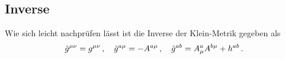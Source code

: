 \subsection{Inverse}
Wie sich leicht nachprüfen lässt ist die Inverse der Klein-Metrik gegeben als
\begin{equation}
\tensor{\hat{g}}{^\mu^\nu}=\tensor{g}{^\mu^\nu}\,,\quad
\tensor{\hat{g}}{^a^\mu}=-\tensor{A}{^a^\mu}\,,\quad
\tensor{\hat{g}}{^a^b}=\tensor*{A}{^a_\mu}\tensor*{A}{^b^\mu}+\tensor{h}{^a^b}\,.
\end{equation}
